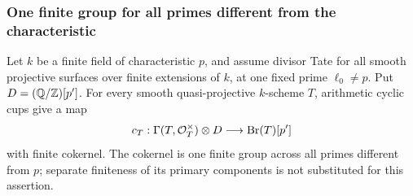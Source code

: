 \subsubsection{One finite group for all primes different from the characteristic}

\begin{lemma}
\label{lem:B-unit-cup-prime-uniform}
Let \(k\) be a finite field of characteristic \(p\), and assume
divisor Tate for all smooth projective surfaces over finite
extensions of \(k\), at one fixed prime \(\ell_0\ne p\).
Put \(D=(\mathbb Q/\mathbb Z)[p']\).  For every smooth quasi-projective
\(k\)-scheme \(T\), arithmetic cyclic cups give a map
\[
 c_T:\Gamma(T,\mathcal O_T^\times)\otimes D
       \longrightarrow \operatorname{Br}(T)[p']
\]
with finite cokernel.  The cokernel is one finite group across
all primes different from \(p\); separate finiteness of its
primary components is not substituted for this assertion.
\end{lemma}
